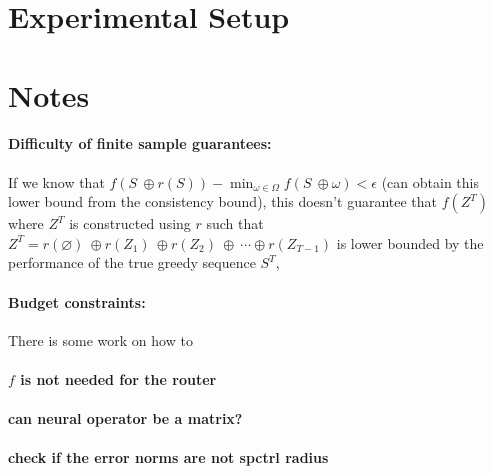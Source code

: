 \documentclass[12pt]{article}
\begin{document}


\section{Experimental Setup}


\section{Notes}

\paragraph{Difficulty of finite sample guarantees:} If we know that $f(S \ \oplus r(S)) - \min_{\omega \in \Omega} f(S \ \oplus \omega) < \epsilon$ (can obtain this lower bound from the consistency bound), this doesn't guarantee that $f(Z^T)$ where $Z^T$ is constructed using $r$ such that $Z^T = r(\varnothing) \ \oplus r(Z_1) \ \oplus r(Z_2) \ \oplus \ \cdots \oplus r(Z_{T - 1})$ is lower bounded by the performance of the true greedy sequence $S^T$,

\paragraph{Budget constraints:} There is some work on how to 

\paragraph{$f$ is not needed for the router}
\paragraph{can neural operator be a matrix?}

\paragraph{check if the error norms are not spctrl radius}
\printbibliography


\appendix

\end{document}
